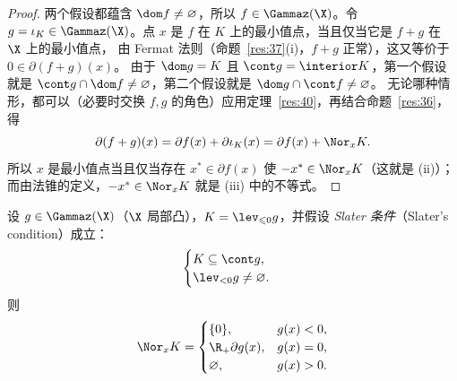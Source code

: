 \begin{proof}
两个假设都蕴含 $\dom f\neq\varnothing$，所以 $f\in\Gammaz(\X)$。令 $g=\iota_K\in\Gammaz(\X)$。点 $x$ 是 $f$ 在 $K$ 上的最小值点，当且仅当它是 $f+g$ 在 $\X$ 上的最小值点，
由 Fermat 法则（命题~\ref{res:37}(i)，$f+g$ 正常），这又等价于 $0\in\partial(f+g)(x)$。
由于 $\dom g=K$ 且 $\cont g=\interior K$，第一个假设就是 $\cont g\cap\dom f\neq\varnothing$，第二个假设就是 $\dom g\cap\cont f\neq\varnothing$。
无论哪种情形，都可以（必要时交换 $f,g$ 的角色）应用定理~\ref{res:40}，再结合命题~\ref{res:36}，得
\[
  \partial(f+g)(x)=\partial f(x)+\partial\iota_K(x)=\partial f(x)+\Nor_xK .
\]
所以 $x$ 是最小值点当且仅当存在 $x^*\in\partial f(x)$ 使 $-x^*\in\Nor_xK$（这就是 (ii)）；而由法锥的定义，$-x^*\in\Nor_xK$ 就是 (iii) 中的不等式。
\end{proof}

\begin{proposition}[下水平集的法锥]
\label{res:44}
设 $g\in\Gammaz(\X)$（$\X$ 局部凸），$K=\lev_{\leqslant0}g$，并假设 \emph{Slater 条件}（Slater's condition）成立：
\[
  \begin{cases}K\subseteq\cont g,\\ \lev_{<0}g\neq\varnothing.\end{cases}
\]
则
\[
  \Nor_xK=\begin{cases}\{0\}, & g(x)<0,\\ \R_+\partial g(x), & g(x)=0,\\ \varnothing, & g(x)>0.\end{cases}
\]
\end{proposition}

